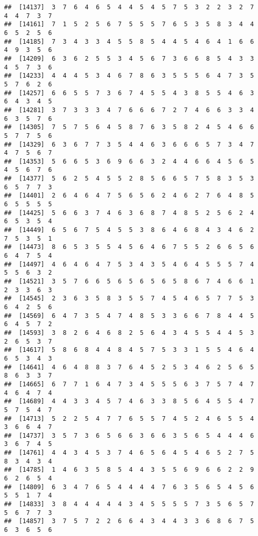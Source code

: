 \documentclass[
]{book}
\begin{document}
\begin{verbatim}
##  [14137]  3  7  6  4  6  5  4  4  5  4  5  7  5  3  2  2  3  2  7  4  4  7  3  7
##  [14161]  7  1  5  2  5  6  7  5  5  5  7  6  5  3  5  8  3  4  4  6  5  2  5  6
##  [14185]  7  3  4  3  3  4  5  5  8  5  4  4  5  4  6  4  1  6  6  4  9  3  5  6
##  [14209]  6  3  6  2  5  5  3  4  5  6  7  3  6  6  8  5  4  3  3  4  5  7  3  6
##  [14233]  4  4  4  5  3  4  6  7  8  6  3  5  5  5  6  4  7  3  5  5  7  6  2  6
##  [14257]  6  6  5  5  7  3  6  7  4  5  5  4  3  8  5  5  4  6  3  6  4  3  4  5
##  [14281]  3  7  3  3  3  4  7  6  6  6  7  2  7  4  6  6  3  3  4  6  3  5  7  6
##  [14305]  7  5  7  5  6  4  5  8  7  6  3  5  8  2  4  5  4  6  6  5  7  7  5  6
##  [14329]  6  3  6  7  7  3  5  4  4  6  3  6  6  6  5  7  3  4  7  4  7  5  6  7
##  [14353]  5  6  6  5  3  6  9  6  6  3  2  4  4  6  6  4  5  6  5  4  5  6  7  6
##  [14377]  5  6  2  5  4  5  5  2  8  5  6  6  5  7  5  8  3  5  3  6  5  7  7  3
##  [14401]  2  6  4  6  4  7  5  6  5  6  2  4  6  2  7  6  4  8  5  6  5  5  5  5
##  [14425]  5  6  6  3  7  4  6  3  6  8  7  4  8  5  2  5  6  2  4  6  5  3  5  4
##  [14449]  6  5  6  7  5  4  5  5  3  8  6  4  6  8  4  3  4  6  2  7  5  3  5  1
##  [14473]  8  6  5  3  5  5  4  5  6  4  6  7  5  5  2  6  6  5  6  6  4  7  5  4
##  [14497]  4  6  4  6  4  7  5  3  4  3  5  4  6  4  5  5  5  7  4  5  5  6  3  2
##  [14521]  3  5  7  6  6  5  6  5  6  5  6  5  8  6  7  4  6  6  1  2  3  3  6  3
##  [14545]  2  3  6  3  5  8  3  5  5  7  4  5  4  6  5  7  7  5  3  6  4  2  5  6
##  [14569]  6  4  7  3  5  4  7  4  8  5  3  3  6  6  7  8  4  4  5  6  4  5  7  2
##  [14593]  3  8  2  6  4  6  8  2  5  6  4  3  4  5  5  4  4  5  3  2  6  5  3  7
##  [14617]  5  8  6  8  4  4  8  4  5  7  5  3  3  1  5  5  4  6  4  6  5  3  4  3
##  [14641]  4  6  4  8  8  3  7  6  4  5  2  5  3  4  6  2  5  6  5  8  6  3  3  7
##  [14665]  6  7  7  1  6  4  7  3  4  5  5  5  6  3  7  5  7  4  7  4  6  4  7  4
##  [14689]  4  4  3  3  4  5  7  4  6  3  3  8  5  6  4  5  5  4  7  5  7  5  4  7
##  [14713]  5  2  2  5  4  7  7  6  5  5  7  4  5  2  4  6  5  5  4  3  6  6  4  7
##  [14737]  3  5  7  3  6  5  6  6  3  6  6  3  5  6  5  4  4  4  6  3  6  7  4  5
##  [14761]  4  4  3  4  5  3  7  4  6  5  6  4  5  4  6  5  2  7  5  8  3  4  3  4
##  [14785]  1  4  6  3  5  8  5  4  4  3  5  5  6  9  6  6  2  2  9  6  2  6  5  4
##  [14809]  6  3  4  7  6  5  4  4  4  4  7  6  3  5  6  5  4  5  6  5  5  1  7  4
##  [14833]  3  8  4  4  4  4  4  3  4  5  5  5  5  7  3  5  6  5  7  5  6  7  7  3
##  [14857]  3  7  5  7  2  2  6  6  4  3  4  4  3  3  6  8  6  7  5  6  3  6  5  6

\end{verbatim}
\end{document}
